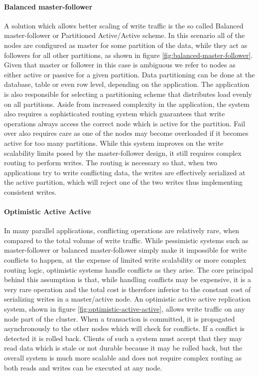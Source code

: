 \paragraph{Balanced master-follower}
A solution which allows better scaling of write traffic is the so called Balanced master-follower or Partitioned Active/Active scheme.
In this scenario all of the nodes are configured as master for some partition of the data, while they act as followers for all other partitions, as shown in figure \ref{fig:balanced-master-follower}.
Given that master or follower in this case is ambiguous we refer to nodes as either active or passive for a given partition.
Data partitioning can be done at the database, table or even row level, depending on the application.
The application is also responsible for selecting a partitioning scheme that distributes load evenly on all partitions.
Aside from increased complexity in the application, the system also requires a sophisticated routing system which guarantees that write operations always access the correct node which is active for the partition.
Fail over also requires care as one of the nodes may become overloaded if it becomes active for too many partitions.
While this system improves on the write scalability limits posed by the master-follower design, it still requires complex routing to perform writes.
The routing is necessary so that, when two applications try to write conflicting data, the writes are effectively serialized at the active partition, which will reject one of the two writes thus implementing consistent writes.

\paragraph{Optimistic Active Active}
In many parallel applications, conflicting operations are relatively rare, when compared to the total volume of write traffic.
While pessimistic systems such as master-follower or balanced master-follower simply make it impossible for write conflicts to happen, at the expense of limited write scalability or more complex routing logic, optimistic systems handle conflicts as they arise.
The core principal behind this assumption is that, while handling conflicts may be expensive, it is a very rare operation and the total cost is therefore inferior to the constant cost of serializing writes in a master/active node.
An optimistic active active replication system, shown in figure \ref{fig:optimistic-active-active}, allows write traffic on any node part of the cluster.
When a transaction is committed, it is propagated asynchronously to the other nodes which will check for conflicts. If a conflict is detected it is rolled back.
Clients of such a system must accept that they may read data which is stale or not durable because it may be rolled back, but the overall system is much more scalable and does not require complex routing as both reads and writes can be executed at any node.

